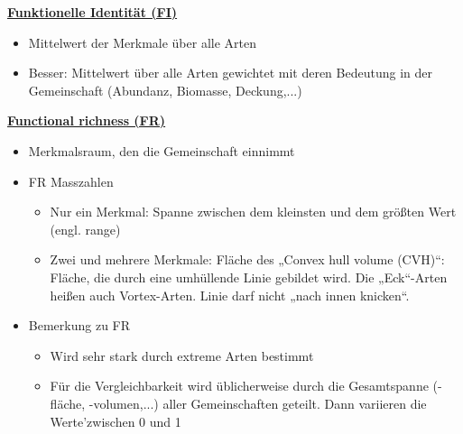 \underline{\textbf{Funktionelle Identität (FI)}}
\begin{itemize}
	\item Mittelwert der Merkmale über alle Arten
	\item Besser: Mittelwert über alle Arten gewichtet mit deren Bedeutung in der Gemeinschaft (Abundanz, Biomasse, Deckung,...)
\end{itemize}

\underline{\textbf{Functional richness (FR)}}\\
\begin{itemize}
	\item Merkmalsraum, den die Gemeinschaft einnimmt
	\item FR Masszahlen
	\begin{itemize}
		\item Nur ein Merkmal: Spanne zwischen dem kleinsten und dem größten Wert (engl. range)
		\item Zwei und mehrere Merkmale: Fläche des „Convex hull volume (CVH)“: Fläche, die durch eine umhüllende Linie gebildet wird. Die „Eck“-Arten heißen auch Vortex-Arten. Linie darf nicht „nach innen knicken“.
	\end{itemize}
	\item Bemerkung zu FR
	\begin{itemize}
		\item Wird sehr stark durch extreme Arten bestimmt
		\item Für die Vergleichbarkeit wird üblicherweise durch die Gesamtspanne (-fläche, -volumen,...) aller Gemeinschaften geteilt. Dann variieren die Werte'zwischen 0 und 1
	\end{itemize}
\end{itemize}